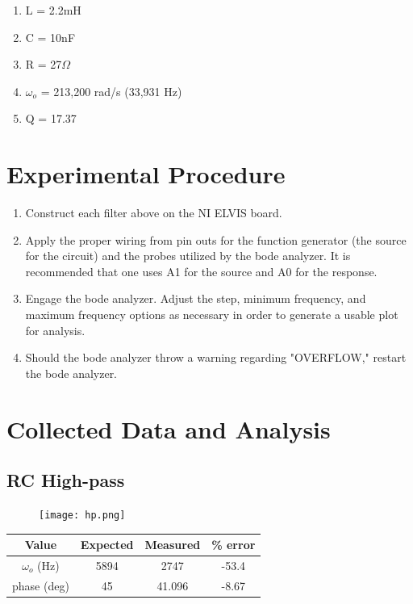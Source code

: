 \documentclass[journal]{IEEEtran}
\begin{document}
\begin{enumerate}
\item
L = 2.2mH
\item
C = 10nF
\item
R = 27$\Omega$
\item
$\omega_{o}$ = 213,200 rad/s (33,931 Hz)
\item
Q = 17.37
\end{enumerate}

\section{Experimental Procedure}

\begin{enumerate}
\item
Construct each filter above on the NI ELVIS board.
\item
Apply the proper wiring from pin outs for the function generator (the source for the circuit) and the probes utilized by the bode analyzer. It is recommended that one uses A1 for the source and A0 for the response.
\item
Engage the bode analyzer. Adjust the step, minimum frequency, and maximum frequency options as necessary in order to generate a usable plot for analysis.
\item
Should the bode analyzer throw a warning regarding "OVERFLOW," restart the bode analyzer.
\end{enumerate}

\section{Collected Data and Analysis}

\subsection{RC High-pass}

\begin{figure}[H]
\centering
\texttt{[image: hp.png]}
\label{fig_hp}
\end{figure}

\begin{tabular}{|c|c|c|c|}
\hline
Value & Expected & Measured & \% error \\
\hline
$\omega_{o}$ (Hz) & 5894 & 2747 & -53.4\\
\hline
phase (deg) & 45 & 41.096 & -8.67\\
\hline
\end{tabular}
\end{document}
